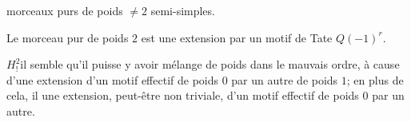 



morceaux purs de poids $\ne2$  semi-simples.

\margin{$\Vert$}
Le morceau pur de poids $2$ est une extension par un motif de Tate $Q(-1)^r$.

$H^2_!$\qquad il semble qu'il puisse y avoir mélange de poids dans le mauvais ordre, à cause d'une extension d'un motif effectif de poids $0$ par un autre de poids $1$; en plus de cela, il  une extension, peut-être non triviale, d'un motif effectif de poids $0$  par un autre.
